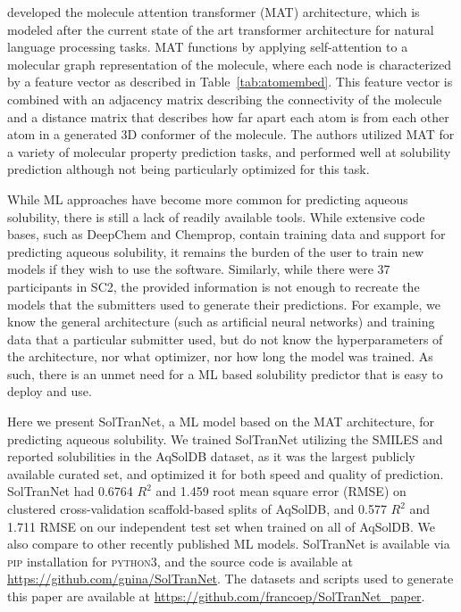 \documentclass[journal=jmcmar,manuscript=article]{achemso}
\begin{document}
\citet{MAT} developed the molecule attention transformer (MAT) architecture, which is modeled after the current state of the art transformer architecture for natural language processing tasks.
MAT functions by applying self-attention to a molecular graph representation of the molecule, where each node is characterized by a feature vector as described in Table~\ref{tab:atomembed}.
This feature vector is combined with an adjacency matrix describing the connectivity of the molecule and a distance matrix that describes how far apart each atom is from each other atom in a generated 3D conformer of the molecule.
The authors utilized MAT for a variety of molecular property prediction tasks, and performed well at solubility prediction although not being particularly optimized for this task.

While ML approaches have become more common for predicting aqueous solubility, there is still a lack of readily available tools.
While extensive code bases, such as DeepChem\cite{deepchem} and Chemprop\cite{chemprop}, contain training data and support for predicting aqueous solubility, it remains the burden of the user to train new models if they wish to use the software.
Similarly, while there were 37 participants in SC2, the provided information is not enough to recreate the models that the submitters used to generate their predictions.
For example, we know the general architecture (such as artificial neural networks) and training data that a particular submitter used, but do not know the hyperparameters of the architecture, nor what optimizer, nor how long the model was trained.
As such, there is an unmet need for a ML based solubility predictor that is easy to deploy and use.

Here we present SolTranNet, a ML model based on the MAT architecture, for predicting aqueous solubility.
We trained SolTranNet utilizing the SMILES and reported solubilities in the AqSolDB dataset\cite{AqSol}, as it was the largest publicly available curated set, and optimized it for both speed and quality of prediction.
SolTranNet had 0.6764 $R^2$ and 1.459 root mean square error (RMSE) on clustered cross-validation scaffold-based splits of AqSolDB, and 0.577 $R^2$ and 1.711 RMSE on our independent test set when trained on all of AqSolDB.
We also compare to other recently published ML models.\cite{lovric,cui,boobier,llinas}
SolTranNet is available via \textsc{pip} installation for \textsc{python3}, and the source code is available at \url{https://github.com/gnina/SolTranNet}. The datasets and scripts used to generate this paper are available at \url{https://github.com/francoep/SolTranNet_paper}.
\end{document}

